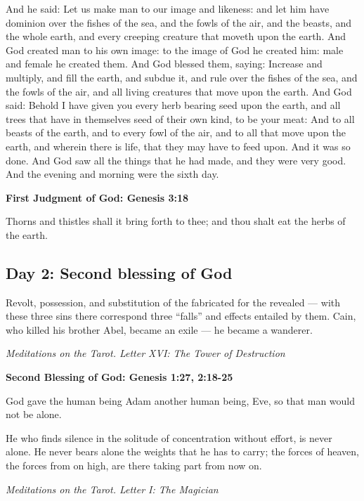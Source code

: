 And he said: Let us make man to our image and likeness: and let him have dominion over the fishes of the sea, and the
fowls of the air, and the beasts, and the whole earth, and every creeping creature that moveth upon the earth. And God
created man to his own image: to the image of God he created him: male and female he created them. And God blessed
them, saying: Increase and multiply, and fill the earth, and subdue it, and rule over the fishes of the sea, and the
fowls of the air, and all living creatures that move upon the earth. And God said: Behold I have given you every herb
bearing seed upon the earth, and all trees that have in themselves seed of their own kind, to be your meat: And to all
beasts of the earth, and to every fowl of the air, and to all that move upon the earth, and wherein there is life, that
they may have to feed upon. And it was so done. And God saw all the things that he had made, and they were very good.
And the evening and morning were the sixth day.

\textbf{First Judgment of God: Genesis 3:18}

Thorns and thistles shall it bring forth to thee; and thou shalt eat the herbs of the earth.

\subsection*{Day 2: Second blessing of God}
\begin{quotationx}
Revolt, possession, and substitution of the fabricated for the revealed — with these three sins
there correspond three “falls” and effects entailed by them. Cain, who killed his brother Abel, became an exile
— he became a wanderer. \begin{flushright} \emph{Meditations on the Tarot. Letter XVI: The Tower of Destruction}\end{flushright}

\end{quotationx}

\textbf{Second Blessing of God: Genesis 1:27, 2:18-25}

God gave the human being Adam another human being, Eve, so that man would not be alone.

\begin{quotationx}
He who finds silence in the solitude of concentration without effort, is never alone. He never bears alone the weights
that he has to carry; the forces of heaven, the forces from on high, are there taking part from now on. \begin{flushright}
\emph{Meditations on the Tarot. Letter I: The Magician}\end{flushright}

\end{quotationx}

